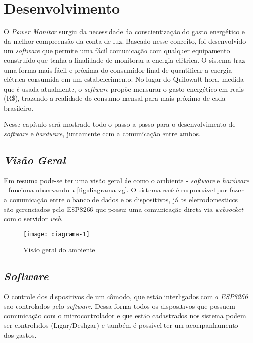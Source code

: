 \chapter[Desenvolvimento]{Desenvolvimento}
\label{ch:desenvolvimento}
O \textit{Power Monitor} surgiu da necessidade da conscientização do gasto energético e da melhor compreensão da conta de luz. Baseado nesse conceito,
foi desenvolvido um \textit{software} que permite uma fácil comunicação com qualquer equipamento construído que tenha a finalidade de monitorar a energia elétrica. 
O sistema traz uma forma mais fácil e próxima do consumidor final de quantificar a energia elétrica consumida em um estabelecimento. No lugar do Quilowatt-hora, medida que é usada atualmente,
o \textit{software} propõe mensurar o gasto energético em reais (R\$), trazendo a realidade do consumo mensal para mais próximo de cada brasileiro.

Nesse capítulo será mostrado todo o passo a passo para o desenvolvimento do \textit{software} e \textit{hardware}, juntamente com a comunicação 
entre ambos. 


\section[\textit{Visão Geral}]{\textit{Visão Geral}}\label{visal-geral}

Em resumo pode-se ter uma visão geral de como o ambiente - \textit{software} e \textit{hardware} - funciona observando a \autoref{fig:diagrama-vg}.
O sistema \textit{web} é responsável por fazer a comunicação entre o banco de dados e os dispositivos, já os eletrodomesticos são gerenciados
pelo ESP8266 que possui uma comunicação direta via \textit{websocket} com o servidor \textit{web}.

\begin{figure}[h!]
	\texttt{[image: diagrama-1]}
	\centering
	\caption[Visão geral do ambiente]{Visão geral do ambiente}
	\label{fig:diagrama-vg}
\end{figure}
\FloatBarrier

\section[\textit{Software}]{\textit{Software}}\label{soft-sec}
O controle dos dispositivos de um cômodo, que estão interligados com o \textit{ESP8266} são controlados pelo \textit{software}. Dessa forma
todos os dispositivos que possuem comunicação com o microcontrolador e que estão cadastrados nos sistema podem ser controlados (Ligar/Desligar) e também
é possível ter um acompanhamento dos gastos.

